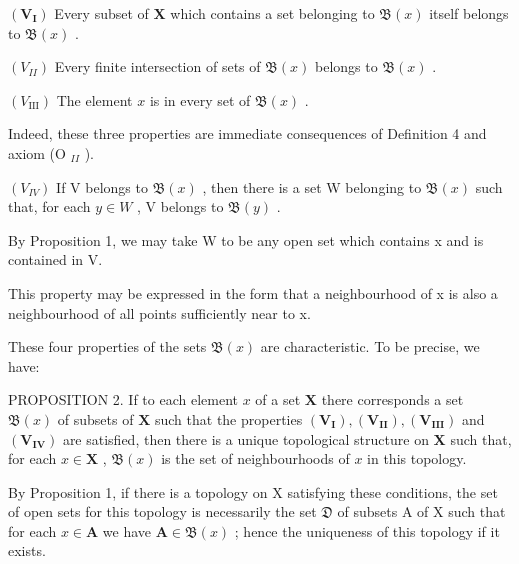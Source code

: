 \((\mathbf{V}_{\mathbf{I}})\) Every subset of \(\mathbf{X}\) which contains a set belonging to \(\mathfrak{B}(x)\) itself belongs to \(\mathfrak{B}(x)\) .

\((V_{II})\) Every finite intersection of sets of \(\mathfrak{B}(x)\) belongs to \(\mathfrak{B}(x)\) .

\((V_{\mathrm{III}})\) The element \(x\) is in every set of \(\mathfrak{B}(x)\) .

Indeed, these three properties are immediate consequences of Definition 4 and axiom (O \(_{II}\) ).

\((V_{IV})\) If V belongs to \(\mathfrak{B}(x)\) , then there is a set W belonging to \(\mathfrak{B}(x)\) such that, for each \(y \in W\) , V belongs to \(\mathfrak{B}(y)\) .

By Proposition 1, we may take W to be any open set which contains x and is contained in V.

This property may be expressed in the form that a neighbourhood of x is also a neighbourhood of all points sufficiently near to x.

These four properties of the sets \(\mathfrak{B}(x)\) are characteristic. To be precise, we have:

PROPOSITION 2. If to each element \(x\) of a set \(\mathbf{X}\) there corresponds a set \(\mathfrak{B}(x)\) of subsets of \(\mathbf{X}\) such that the properties \((\mathbf{V}_{\mathbf{I}}), (\mathbf{V}_{\mathbf{II}}), (\mathbf{V}_{\mathbf{III}})\) and \((\mathbf{V}_{\mathbf{IV}})\) are satisfied, then there is a unique topological structure on \(\mathbf{X}\) such that, for each \(x \in \mathbf{X}\) , \(\mathfrak{B}(x)\) is the set of neighbourhoods of \(x\) in this topology.

By Proposition 1, if there is a topology on X satisfying these conditions, the set of open sets for this topology is necessarily the set \(\mathfrak{D}\) of subsets A of X such that for each \(x \in \mathbf{A}\) we have \(\mathbf{A} \in \mathfrak{B}(x)\) ; hence the uniqueness of this topology if it exists.

